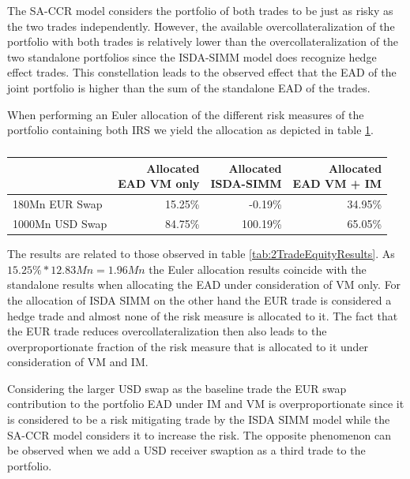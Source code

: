 \documentclass[../Thesis_AHoecherl.tex]{subfiles}
\begin{document}
    The SA-CCR model considers the portfolio of both trades to be just as risky as the two trades independently. However, the available overcollateralization of the portfolio with both trades is relatively lower than the overcollateralization of the two standalone portfolios since the ISDA-SIMM model does recognize hedge effect trades. This constellation leads to the observed effect that the EAD of the joint portfolio is higher than the sum of the standalone EAD of the trades.

    When performing an Euler allocation of the different risk measures of the portfolio containing both IRS we yield the allocation as depicted in table \ref{tab:2TradeRatesAllocation}.

    \begin{table}[htbp]
        \centering
        \begin{tabular}{l||r|r|r}
                & \makecell{Allocated \\ EAD VM only} & \makecell{Allocated \\ ISDA-SIMM} & \makecell{Allocated \\ EAD VM + IM} \\
                \toprule
        180Mn EUR Swap & 15.25\% & -0.19\% & 34.95\% \\
        1000Mn USD Swap & 84.75\% & 100.19\% & 65.05\% \\
        \end{tabular}%
        \caption{}
        \label{tab:2TradeRatesAllocation}%
    \end{table}%
    
    The results are related to those observed in table \ref{tab:2TradeEquityResults}. As $15.25\% * 12.83Mn = 1.96Mn$ the Euler allocation results coincide with the standalone results when allocating the EAD under consideration of VM only. 
    For the allocation of ISDA SIMM on the other hand the EUR trade is considered a hedge trade and almost none of the risk measure is allocated to it. 
    The fact that the EUR trade reduces overcollateralization then also leads to the overproportionate fraction of the risk measure that is allocated to it under consideration of VM and IM.
    
    Considering the larger USD swap as the baseline trade the EUR swap contribution to the portfolio EAD under IM and VM is overproportionate since it is considered to be a risk mitigating trade by the ISDA SIMM model while the SA-CCR model considers it to increase the risk. The opposite phenomenon can be observed when we add a USD receiver swaption as a third trade to the portfolio.
\end{document}
